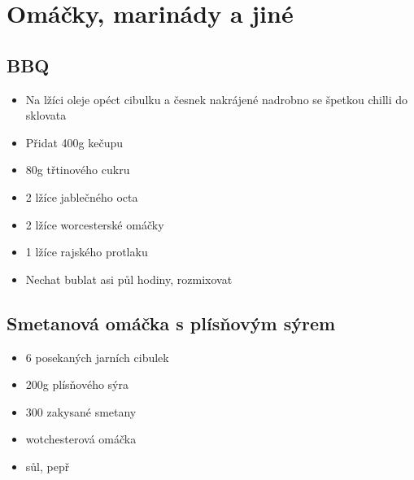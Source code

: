 \documentclass[10pt,a4paper]{article}
\newenvironment{myitemize}
{ \begin{itemize}
    \setlength{\itemsep}{0pt}
    \setlength{\parskip}{0pt}
    \setlength{\parsep}{0pt}     }
{ \end{itemize}                  }
\begin{document}
\section{Omáčky, marinády a jiné}
\subsection{BBQ} \label{bbq}
\begin{minipage}[t]{0,5\textwidth}
\begin{myitemize} 
\item Na lžíci oleje opéct cibulku a česnek nakrájené nadrobno se špetkou chilli do sklovata
\item Přidat 400g kečupu
\item 80g třtinového cukru
\item 2 lžíce jablečného octa
\item 2 lžíce worcesterské omáčky
\item 1 lžíce rajského protlaku
\item Nechat bublat asi půl hodiny, rozmixovat
\end{myitemize}
\end{minipage}
\begin{minipage}[t]{0,5\textwidth}

\end{minipage}
\subsection{Smetanová omáčka s plísňovým sýrem}
\begin{minipage}[t]{0,5\textwidth}
\begin{myitemize} 
\item 6 posekaných jarních cibulek
\item 200g plísňového sýra
\item 300 zakysané smetany
\item wotchesterová omáčka
\item sůl, pepř
\end{myitemize}
\end{minipage}
\begin{minipage}[t]{0,5\textwidth}

\end{minipage}
\end{document}
